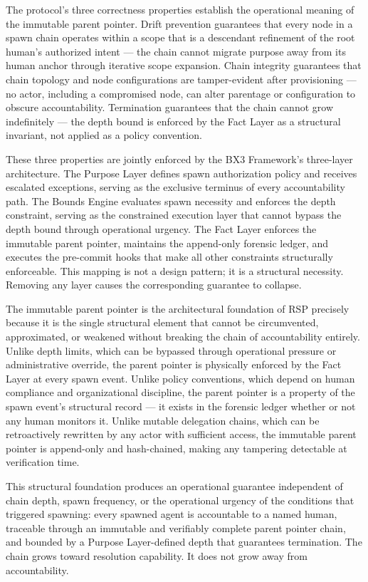 The protocol's three correctness properties establish the operational meaning of the immutable parent pointer. Drift prevention guarantees that every node in a spawn chain operates within a scope that is a descendant refinement of the root human's authorized intent — the chain cannot migrate purpose away from its human anchor through iterative scope expansion. Chain integrity guarantees that chain topology and node configurations are tamper-evident after provisioning — no actor, including a compromised node, can alter parentage or configuration to obscure accountability. Termination guarantees that the chain cannot grow indefinitely — the depth bound is enforced by the Fact Layer as a structural invariant, not applied as a policy convention.

These three properties are jointly enforced by the BX3 Framework's three-layer architecture. The Purpose Layer defines spawn authorization policy and receives escalated exceptions, serving as the exclusive terminus of every accountability path. The Bounds Engine evaluates spawn necessity and enforces the depth constraint, serving as the constrained execution layer that cannot bypass the depth bound through operational urgency. The Fact Layer enforces the immutable parent pointer, maintains the append-only forensic ledger, and executes the pre-commit hooks that make all other constraints structurally enforceable. This mapping is not a design pattern; it is a structural necessity. Removing any layer causes the corresponding guarantee to collapse.

The immutable parent pointer is the architectural foundation of RSP precisely because it is the single structural element that cannot be circumvented, approximated, or weakened without breaking the chain of accountability entirely. Unlike depth limits, which can be bypassed through operational pressure or administrative override, the parent pointer is physically enforced by the Fact Layer at every spawn event. Unlike policy conventions, which depend on human compliance and organizational discipline, the parent pointer is a property of the spawn event's structural record — it exists in the forensic ledger whether or not any human monitors it. Unlike mutable delegation chains, which can be retroactively rewritten by any actor with sufficient access, the immutable parent pointer is append-only and hash-chained, making any tampering detectable at verification time.

This structural foundation produces an operational guarantee independent of chain depth, spawn frequency, or the operational urgency of the conditions that triggered spawning: every spawned agent is accountable to a named human, traceable through an immutable and verifiably complete parent pointer chain, and bounded by a Purpose Layer-defined depth that guarantees termination. The chain grows toward resolution capability. It does not grow away from accountability.

